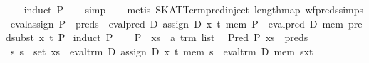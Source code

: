 \begin{isabellebody}
%
\isadelimproof
\ \ %
\endisadelimproof
%
\isatagproof
{}\isamarkupfalse%
\ {}induct\ P{}\isanewline
\ \ \isamarkupfalse%
\ simp\isanewline
\ \ \isamarkupfalse%
\ {}metis\ SKAT{}Term{}pred{}inject\ length{}map\ wf{}preds{}simps{}%
\endisatagproof
{\isafoldproof}%
%
\isadelimproof
\isanewline
%
\endisadelimproof
\isanewline
{}\isamarkupfalse%
\ eval{}assign{}{}\ {}P\ {}\ preds\ {}\ eval{}pred\ D\ {}assign\ D\ x\ t\ mem{}\ P\ {}\ eval{}pred\ D\ mem\ {}pred{}subst\ x\ t\ P{}{}\isanewline
%
\isadelimproof
%
\endisadelimproof
%
\isatagproof
{}\isamarkupfalse%
\ {}induct\ P{}\isanewline
\ \ \isamarkupfalse%
\ P\ \ xs\ {}{}\ {}{}a\ trm\ list{}\ \isamarkupfalse%
\ {}Pred\ P\ xs\ {}\ preds{}\isanewline
\ \ \isamarkupfalse%
\ {}{}s{}\ s\ {}\ set\ xs\ {}\ eval{}trm\ D\ {}assign\ D\ x\ t\ mem{}\ s\ {}\ eval{}trm\ D\ mem\ {}s{}x{}t{}{}{}\isanewline

\end{isabellebody}
